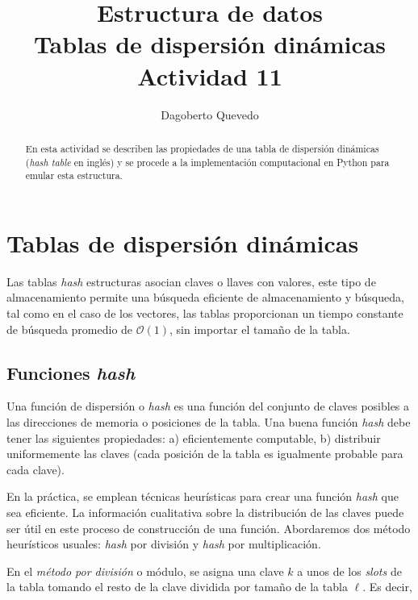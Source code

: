 \documentclass[letterpaper,11pt]{article}
\begin{document}
\title{Estructura de datos\\\Large Tablas de dispersión dinámicas\\\small Actividad 11}
\author{Dagoberto Quevedo}
\maketitle

\begin{abstract}
En esta actividad se describen las propiedades de una tabla de dispersión dinámicas (\textit{hash table} en inglés) y se procede a la implementación computacional en Python para emular esta estructura.

\end{abstract}

\section{Tablas de dispersión dinámicas}

Las tablas \textit{hash} estructuras asocian claves o llaves con valores, este tipo de almacenamiento permite una búsqueda eficiente de almacenamiento y búsqueda, tal como en el caso de los vectores, las tablas proporcionan un 
tiempo constante de búsqueda promedio de $\mathcal{O}(1)$, sin importar el tamaño de la tabla.

\subsection{Funciones \textit{hash}}

Una función de dispersión o \textit{hash} es una función del conjunto de claves posibles a las direcciones de memoria o posiciones de la tabla. Una buena función \textit{hash} debe tener las siguientes propiedades: a) eficientemente computable, b) distribuir uniformemente las claves (cada posición de la tabla es igualmente probable para cada clave).

En la práctica, se emplean técnicas heurísticas para crear una función \textit{hash} que sea eficiente. La información cualitativa sobre la distribución de las claves puede ser útil en este proceso de construcción de una función. Abordaremos dos método heurísticos usuales: \textit{hash} por división y \textit{hash} por multiplicación.

En el \textit{método por división} o módulo, se asigna una clave $k$ a unos de los \textit{slots} de la tabla tomando el resto de la clave dividida por tamaño de la tabla $\ell$. Es decir, 
\end{document}

